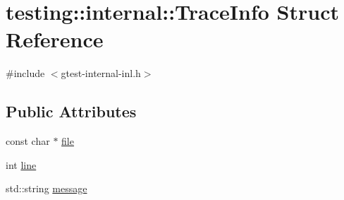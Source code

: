 \hypertarget{structtesting_1_1internal_1_1_trace_info}{\section{testing\-:\-:internal\-:\-:Trace\-Info Struct Reference}
\label{structtesting_1_1internal_1_1_trace_info}
}


{\ttfamily \#include $<$gtest-\/internal-\/inl.\-h$>$}

\subsection*{Public Attributes}
\begin{DoxyCompactItemize}
\item 
const char $\ast$ \hyperlink{structtesting_1_1internal_1_1_trace_info_affad3e5ecae450b368073ee33a115fee}{file}
\item 
int \hyperlink{structtesting_1_1internal_1_1_trace_info_ae9d269de1b77f4a3180d0d34acb4d7ff}{line}
\item 
std\-::string \hyperlink{structtesting_1_1internal_1_1_trace_info_a39e74f39ce6d5fdbac799abdb1c27f90}{message}
\end{DoxyCompactItemize}


